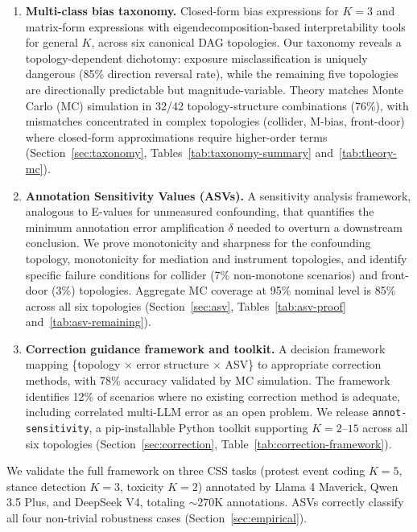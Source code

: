 \documentclass[11pt]{article}
\begin{document}
\begin{enumerate}[leftmargin=*, itemsep=2pt]
\item \textbf{Multi-class bias taxonomy.}
Closed-form bias expressions for $K=3$ and matrix-form expressions with eigendecomposition-based interpretability tools for general $K$, across six canonical DAG topologies.
Our taxonomy reveals a topology-dependent dichotomy: exposure misclassification is uniquely dangerous (85\% direction reversal rate), while the remaining five topologies are directionally predictable but magnitude-variable.
Theory matches Monte Carlo (MC) simulation in 32/42 topology-structure combinations (76\%), with mismatches concentrated in complex topologies (collider, M-bias, front-door) where closed-form approximations require higher-order terms (Section~\ref{sec:taxonomy}, Tables~\ref{tab:taxonomy-summary} and~\ref{tab:theory-mc}).

\item \textbf{Annotation Sensitivity Values (ASVs).}
A sensitivity analysis framework, analogous to E-values for unmeasured confounding, that quantifies the minimum annotation error amplification $\delta$ needed to overturn a downstream conclusion.
We prove monotonicity and sharpness for the confounding topology, monotonicity for mediation and instrument topologies, and identify specific failure conditions for collider (7\% non-monotone scenarios) and front-door (3\%) topologies.
Aggregate MC coverage at 95\% nominal level is 85\% across all six topologies (Section~\ref{sec:asv}, Tables~\ref{tab:asv-proof} and~\ref{tab:asv-remaining}).

\item \textbf{Correction guidance framework and toolkit.}
A decision framework mapping \{topology $\times$ error structure $\times$ ASV\} to appropriate correction methods, with 78\% accuracy validated by MC simulation.
The framework identifies 12\% of scenarios where no existing correction method is adequate, including correlated multi-LLM error as an open problem.
We release \texttt{annot-sensitivity}, a pip-installable Python toolkit supporting $K=2$--$15$ across all six topologies (Section~\ref{sec:correction}, Table~\ref{tab:correction-framework}).
\end{enumerate}

We validate the full framework on three CSS tasks (protest event coding $K=5$, stance detection $K=3$, toxicity $K=2$) annotated by Llama 4 Maverick, Qwen 3.5 Plus, and DeepSeek V4, totaling $\sim$270K annotations.
ASVs correctly classify all four non-trivial robustness cases (Section~\ref{sec:empirical}).
\end{document}
